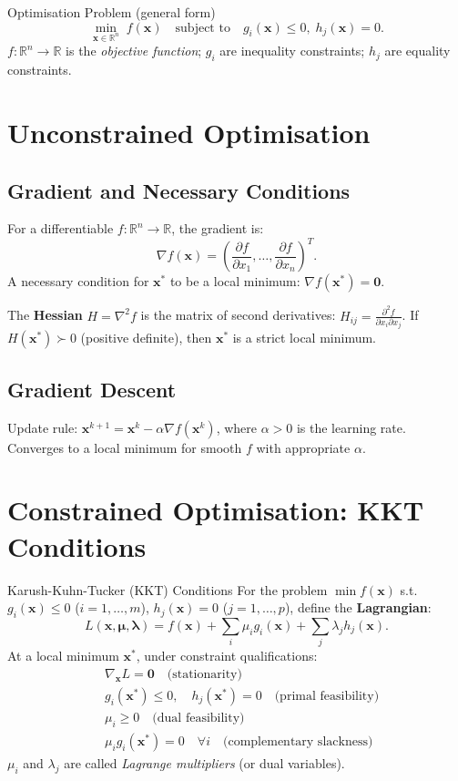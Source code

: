 \documentclass[12pt,a4paper,openany]{book}
\newcommand{\R}{\mathbb{R}}
\newcommand{\bx}{\bm{x}}
\begin{document}
\begin{defbox}{Optimisation Problem (general form)}
\[\min_{\bx\in\R^n}\;f(\bx)\quad\text{subject to}\quad g_i(\bx)\leq0,\;h_j(\bx)=0.\]
$f:\R^n\to\R$ is the \emph{objective function}; $g_i$ are inequality constraints; $h_j$ are equality constraints.
\end{defbox}

\section{Unconstrained Optimisation}

\subsection{Gradient and Necessary Conditions}

For a differentiable $f:\R^n\to\R$, the gradient is:
\[\nabla f(\bx)=\left(\frac{\partial f}{\partial x_1},\ldots,\frac{\partial f}{\partial x_n}\right)^T.\]
A necessary condition for $\bx^*$ to be a local minimum: $\nabla f(\bx^*)=\bm{0}$.

The \textbf{Hessian} $H=\nabla^2 f$ is the matrix of second derivatives: $H_{ij}=\frac{\partial^2 f}{\partial x_i\partial x_j}$. If $H(\bx^*)\succ 0$ (positive definite), then $\bx^*$ is a strict local minimum.

\subsection{Gradient Descent}

Update rule: $\bx^{k+1}=\bx^k - \alpha\nabla f(\bx^k)$, where $\alpha>0$ is the learning rate. Converges to a local minimum for smooth $f$ with appropriate $\alpha$.

\section{Constrained Optimisation: KKT Conditions}

\begin{thmbox}{Karush-Kuhn-Tucker (KKT) Conditions}
For the problem $\min f(\bx)$ s.t.\ $g_i(\bx)\leq0$ ($i=1,\ldots,m$),
$h_j(\bx)=0$ ($j=1,\ldots,p$), define the \textbf{Lagrangian}:
\[L(\bx,\bm{\mu},\bm{\lambda})=f(\bx)+\sum_i\mu_i g_i(\bx)+\sum_j\lambda_j h_j(\bx).\]
At a local minimum $\bx^*$, under constraint qualifications:
\begin{align}
&\nabla_{\bx}L=\bm{0}\quad\text{(stationarity)}\label{kkt1}\\
&g_i(\bx^*)\leq0,\quad h_j(\bx^*)=0\quad\text{(primal feasibility)}\label{kkt2}\\
&\mu_i\geq0\quad\text{(dual feasibility)}\label{kkt3}\\
&\mu_i g_i(\bx^*)=0\quad\forall i\quad\text{(complementary slackness)}\label{kkt4}
\end{align}
$\mu_i$ and $\lambda_j$ are called \emph{Lagrange multipliers} (or dual variables).
\end{thmbox}
\end{document}
